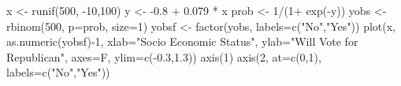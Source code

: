 \begin{Schunk}
\begin{Sinput}
 x <- runif(500, -10,100)
 y <- -0.8 + 0.079 * x
 prob <- 1/(1+ exp(-y))
 yobs <- rbinom(500, p=prob, size=1)
 yobsf <- factor(yobs, labels=c("No","Yes"))
 plot(x, as.numeric(yobsf)-1, xlab="Socio Economic Status", ylab="Will Vote for Republican", axes=F, ylim=c(-0.3,1.3))
 axis(1)
 axis(2, at=c(0,1), labels=c("No","Yes"))
\end{Sinput}
\end{Schunk}
